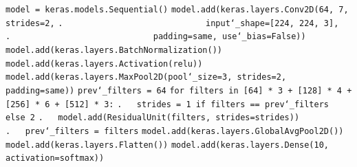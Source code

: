 \texttt{model = keras.models.Sequential()}\newline
\texttt{model.add(keras.layers.Conv2D(64, 7, strides=2,}\newline
\texttt{.~~~~~~~~~~~~~~~~~~~~~~~~~~~~~input\char`_shape=[224, 224, 3],}\newline
\texttt{.~~~~~~~~~~~~~~~~~~~~~~~~~~~~~padding=\textquotesingle same\textquotesingle, use\char`_bias=False))}\newline
\texttt{model.add(keras.layers.BatchNormalization())}\newline
\texttt{model.add(keras.layers.Activation(\textquotesingle relu\textquotesingle))}\newline
\texttt{model.add(keras.layers.MaxPool2D(pool\char`_size=3, strides=2, padding=\textquotesingle same\textquotesingle))}\newline
\texttt{prev\char`_filters = 64}\newline
\texttt{for filters in [64] * 3 + [128] * 4 + [256] * 6 + [512] * 3:}\newline
\texttt{.~~~strides = 1 if filters == prev\char`_filters else 2}\newline
\texttt{.~~~model.add(ResidualUnit(filters, strides=strides))}\newline
\texttt{.~~~prev\char`_filters = filters}\newline
\texttt{model.add(keras.layers.GlobalAvgPool2D())}\newline
\texttt{model.add(keras.layers.Flatten())}\newline
\texttt{model.add(keras.layers.Dense(10, activation=\textquotesingle softmax\textquotesingle))}

\newpage